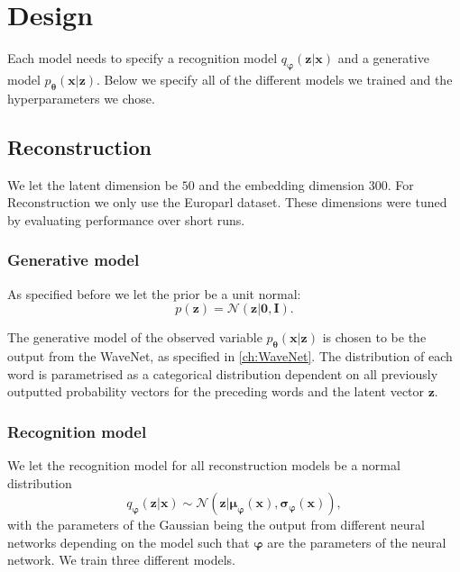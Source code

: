 \section{Design}
Each model needs to specify a recognition model $q_{\bm{\varphi}}(\bm{z} |
\bm{x})$ and a generative model $p_{\bm{\theta}}(\bm{x} | \bm{z})$. Below we
specify all of the different models we trained and the hyperparameters we chose.

\subsection{Reconstruction}
We let the latent dimension be $50$ and the embedding dimension $300$. For
Reconstruction we only use the Europarl dataset. These dimensions were tuned by
evaluating performance over short runs.

\subsubsection{Generative model}
As specified before we let the prior be a unit normal:
\begin{equation}
  \label{eq:prior_distribution_generative}
  p(\bm{z}) = \mathcal{N}(\bm{z} | \bm{0}, \bm{I}).
\end{equation}

The generative model of the observed variable $p_{\bm{\theta}}(\bm{x} | \bm{z})$
is chosen to be the output from the WaveNet, as specified in \ref{ch:WaveNet}.
The distribution of each word is parametrised as a categorical
distribution dependent on all previously outputted probability vectors for the
preceding words and the latent vector $\bm{z}$.

\subsubsection{Recognition model}
We let the recognition model for all reconstruction models be a normal distribution
\begin{equation}
  \label{eq:rec_model_reconstruction}
  q_{\bm{\varphi}}(\bm{z} | \bm{x}) \sim \mathcal{N}(\bm{z}| \bm{\mu_{\bm{\varphi}}}(\bm{x}),
\bm{\sigma}_{\bm{\varphi}}(\bm{x})),
\end{equation}
with the parameters of the Gaussian being the output from different neural
networks depending on the model such that $\bm{\varphi}$ are the parameters of
the neural network. We train three different models.



